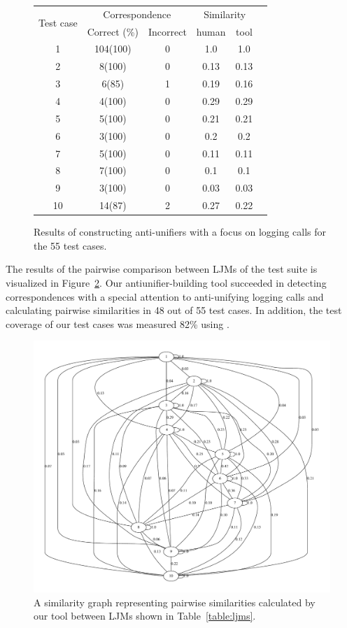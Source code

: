  
\begin{figure}
  \centering
  \begin{tabular}{|c|c|c|c|c|c|}
    \hline
    \multirow{2}{*}{Test case}&\multicolumn{2}{c|}{Correspondence}&\multicolumn{2}{c|}{Similarity}\\
    \cline{2-5}
    &Correct (\%)&Incorrect&human&tool\\
    \hline
    1&104(100)&0& 1.0 & 1.0\\
    \hline
    2&8(100)&0& 0.13& 0.13\\
    \hline
    3&6(85)&1&0.19& 0.16\\
    \hline
    4&4(100)&0&0.29 &0.29\\
    \hline
    5&5(100)&0&0.21 &0.21\\
    \hline
    6&3(100)&0&0.2 &0.2\\
    \hline
    7&5(100)&0&0.11 &0.11\\
    \hline
    8&7(100)&0& 0.1&0.1\\
    \hline
    9&3(100)&0&0.03&0.03 \\
    \hline
    10&14(87)&2&0.27 &0.22\\
    \hline
   
  \end{tabular}
  \caption{Results of constructing anti-unifiers with a focus on logging calls for the 55 test cases.}
  \label{study2_test_cases_results}
\end{figure}
 
The results of the pairwise comparison between LJMs of the test suite is visualized in Figure~\ref{fig:au_graph}. Our antiunifier-building tool succeeded in detecting correspondences with a special attention to anti-unifying logging calls and calculating pairwise similarities in 48 out of 55 test cases. In addition, the test coverage of our test cases was measured 82\% using .

\begin{figure} [H]
  \centering\includegraphics [width = \textwidth]{graphviz/au.pdf}
  \caption{A similarity graph representing pairwise similarities calculated by our tool between LJMs shown in Table~\ref{table:ljms}.}
  \label{fig:au_graph}
\end{figure}


